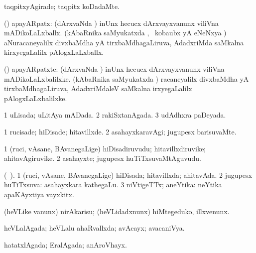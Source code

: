 {{\bentry
{} 
\gl{\kirxvi}
\expl{}
\bmng
taqpitxyAgirade; taqpitx koDadaMte. 
\emng
\eentry

\bentry
{} 
\gl{\gu}
\expl{}
\bmng
(\ravi) apayARpatx: 
\banum
{} (dArxvaNda \vi) inUnx hecucx dArxvayxvanunx viliVna mADikoLaLxballx. 
 (kAbaRnika saMyukatxda \vi, \kanmu\ kobaubx yA eNeNxya \vi) aNuracaneyalilx divxbaMdha yA tirxbaMdhagaLiruva, AdadxriMda saMkalna kirxyegaLalilx pAlogxLaLxballx. 
\eanum
\emng
\eentry

\bentry
{} 
\gl{\nA}
\expl{}
\bmng
(\ravi) apayARpatxte: 
\banum
{} (dArxvaNda \vi) inUnx hecucx dArxvayxvanunx viliVna mADikoLaLxbalilxke. 
 (kAbaRnika saMyukatxda \vi) racaneyalilx divxbaMdha yA tirxbaMdhagaLiruva, AdadxriMdaleV saMkalna irxyegaLalilx pAlogxLaLxbalilxke. 
\eanum
\emng
\eentry

\bentry
{} 
\gl{\gu}
\expl{}
\bmng
\bnum
\num{1} uLisada; uLitAya mADada. 
\num{2} rakiSxtanAgada. 
\num{3} udAdhxra paDeyada. 
\enum
\emng
\eentry

\bentry
{} 
\gl{\kirxvi}
\expl{}
\bmng
\bnum
\num{1} rucisade; hiDisade; hitavillxde. 
\num{2} asahayxkaravAgi; jugupesx barisuvaMte. 
\enum
\emng
\eentry

\bentry
{} 
\gl{\nA}
\expl{}
\bmng
\bnum
\num{1} (ruci, vAsane, BAvanegaLige) hiDisadiruvudu; hitavillxdiruvike; ahitavAgiruvike. 
\num{2} asahayxte; jugupesx huTiTxsuvaMtAguvudu. 
\enum
\emng
\eentry

\bentry
{} 
\gl{\gu}
\expl{}
\bmng
(\ame\ ). 
\bnum
\num{1} (ruci, vAsane, BAvanegaLige) hiDisada; hitavillxda; ahitavAda. 
\num{2} jugupesx huTiTxsuva:  asahayxkara kathegaLu. 
\num{3} niVtigeTTx; aneYtika:  neYtika apaKAyxtiya vayxkitx. 
\enum
\emng
\eentry

\bentry
{} 
\gl{\akirx}
\bmng
(heVLike \mo vanunx) nirAkarisu; (heVLidadxnunx) hiMtegeduko, illxvenunx. 
\emng
\eentry

\bentry
{} 
\gl{\gu}
\expl{}
\bmng
heVLalAgada; heVLalu ahaRvallxda; avAcayx; avacaniVya. 
\emng
\eentry

\bentry
{} 
\gl{\gu}
\expl{}
\bmng
hatatxlAgada; EralAgada; anAroVhayx. 
\emng
\eentry

}}
